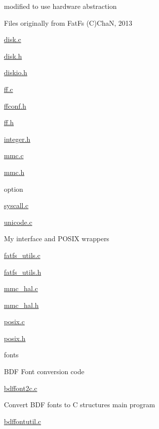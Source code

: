 \begin{DoxyItemize}
\begin{DoxyItemize}
\begin{DoxyItemize}
\item modified to use hardware abstraction
\end{DoxyItemize}
\item Files originally from Fat\-Fs (C)Cha\-N, 2013
\begin{DoxyItemize}
\item \hyperlink{disk_8c}{disk.\-c}
\item \hyperlink{disk_8h}{disk.\-h}
\item \hyperlink{diskio_8h}{diskio.\-h}
\item \hyperlink{ff_8c}{ff.\-c}
\item \hyperlink{ffconf_8h}{ffconf.\-h}
\item \hyperlink{ff_8h}{ff.\-h}
\item \hyperlink{integer_8h}{integer.\-h}
\item \hyperlink{mmc_8c}{mmc.\-c}
\item \hyperlink{mmc_8h}{mmc.\-h}
\item option
\item \hyperlink{syscall_8c}{syscall.\-c}
\item \hyperlink{unicode_8c}{unicode.\-c}
\end{DoxyItemize}
\item My interface and P\-O\-S\-I\-X wrappers
\begin{DoxyItemize}
\item \hyperlink{fatfs__utils_8c}{fatfs\-\_\-utils.\-c}
\item \hyperlink{fatfs__utils_8h}{fatfs\-\_\-utils.\-h}
\item \hyperlink{mmc__hal_8c}{mmc\-\_\-hal.\-c}
\item \hyperlink{mmc__hal_8h}{mmc\-\_\-hal.\-h}
\item \hyperlink{posix_8c}{posix.\-c}
\item \hyperlink{posix_8h}{posix.\-h}
\end{DoxyItemize}
\end{DoxyItemize}
\item fonts
\begin{DoxyItemize}
\item B\-D\-F Font conversion code
\begin{DoxyItemize}
\item \hyperlink{bdffont2c_8c}{bdffont2c.\-c}
\begin{DoxyItemize}
\item Convert B\-D\-F fonts to C structures main program
\end{DoxyItemize}
\item \hyperlink{bdffontutil_8c}{bdffontutil.\-c}

\end{DoxyItemize}
\end{DoxyItemize}
\end{DoxyItemize}
